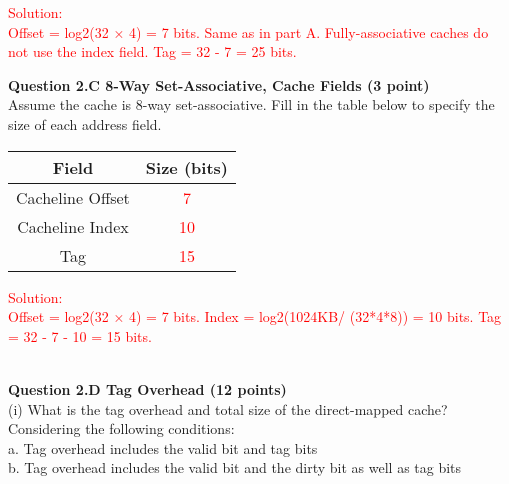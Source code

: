 \documentclass[a4paper,10pt]{article}
\begin{document}
\begin{enumerate}
\noindent\fbox
{%
    \parbox{\linewidth}
    {%
       \textcolor{red}{Solution: \\
       Offset = log2(32 × 4) = 7 bits. Same as in part A. Fully-associative caches do not use the index field. Tag = 32 - 7 = 25 bits.}
    }%
}

\textbf{Question 2.C 8-Way Set-Associative, Cache Fields (3 point)}\\
Assume the cache is 8-way set-associative. Fill in the table below to specify the size of each address field.\\

\begin{center}
\begin{tabular}{cc}
\toprule  
\textbf{Field} & \textbf{ Size (bits)} \\
\midrule  
Cacheline Offset& \textcolor{red}{7}\\
\midrule
Cacheline Index& \textcolor{red}{10}\\
\midrule
Tag& \textcolor{red}{15}\\
\bottomrule 
\end{tabular}
\end{center}

\noindent\fbox
{%
    \parbox{\linewidth}
    {%
    \textcolor{red}{
       Solution: \\
       Offset = log2(32 × 4) = 7 bits. 
       Index = log2(1024KB/ (32*4*8)) = 10 bits. 
       Tag = 32 - 7 - 10 = 15 bits.
       }
    }%
}
\\

\textbf{Question 2.D Tag Overhead (12 points)}\\
(i) What is the tag overhead and total size of the direct-mapped cache? \\
Considering the following conditions:\\
a. Tag overhead includes the valid bit and tag bits\\
b. Tag overhead includes the valid bit and the dirty bit as well as tag bits\\


\end{enumerate}
\end{document}
